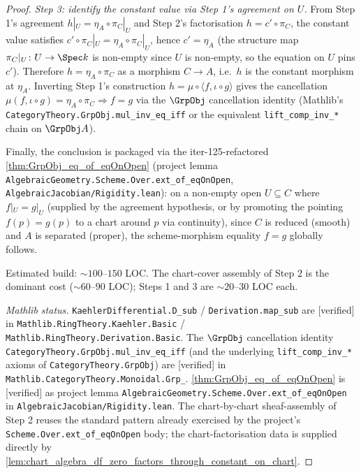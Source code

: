 \begin{proof}
  \emph{Step 3: identify the constant value via Step 1's agreement on \(U\).} From Step 1's agreement \(h|_{U} = \eta_A \circ \pi_C|_{U}\) and Step 2's factorisation \(h = c' \circ \pi_C\), the constant value satisfies \(c' \circ \pi_C|_{U} = \eta_A \circ \pi_C|_{U}\), hence \(c' = \eta_A\) (the structure map \(\pi_C|_{U} \colon U \to \Spec k\) is non-empty since \(U\) is non-empty, so the equation on \(U\) pins \(c'\)). Therefore \(h = \eta_A \circ \pi_C\) as a morphism \(C \to A\), i.e.\ \(h\) is the constant morphism at \(\eta_A\). Inverting Step 1's construction \(h = \mu \circ \langle f, \iota \circ g \rangle\) gives the cancellation \(\mu(f, \iota \circ g) = \eta_A \circ \pi_C \Rightarrow f = g\) via the \(\GrpObj\) cancellation identity (Mathlib's \texttt{CategoryTheory.GrpObj.mul\_inv\_eq\_iff} or the equivalent \texttt{lift\_comp\_inv\_*} chain on \(\GrpObj A\)).

  Finally, the conclusion is packaged via the iter-125-refactored \cref{thm:GrpObj_eq_of_eqOnOpen} (project lemma \texttt{AlgebraicGeometry.Scheme.Over.ext\_of\_eqOnOpen}, \texttt{AlgebraicJacobian/Rigidity.lean}): on a non-empty open \(U \subseteq C\) where \(f|_{U} = g|_{U}\) (supplied by the agreement hypothesis, or by promoting the pointing \(f(p) = g(p)\) to a chart around \(p\) via continuity), since \(C\) is reduced (smooth) and \(A\) is separated (proper), the scheme-morphism equality \(f = g\) globally follows.

  Estimated build: \(\sim 100\)--\(150\) LOC. The chart-cover assembly of Step 2 is the dominant cost (\(\sim 60\)--\(90\) LOC); Steps 1 and 3 are \(\sim 20\)--\(30\) LOC each.

  \emph{Mathlib status.} \texttt{KaehlerDifferential.D\_sub} / \texttt{Derivation.map\_sub} are [verified] in \texttt{Mathlib.RingTheory.Kaehler.Basic} / \texttt{Mathlib.RingTheory.Derivation.Basic}. The \(\GrpObj\) cancellation identity \texttt{CategoryTheory.GrpObj.mul\_inv\_eq\_iff} (and the underlying \texttt{lift\_comp\_inv\_*} axioms of \texttt{CategoryTheory.GrpObj}) are [verified] in \texttt{Mathlib.CategoryTheory.Monoidal.Grp\_}. \cref{thm:GrpObj_eq_of_eqOnOpen} is [verified] as project lemma \texttt{AlgebraicGeometry.Scheme.Over.ext\_of\_eqOnOpen} in \texttt{AlgebraicJacobian/Rigidity.lean}. The chart-by-chart sheaf-assembly of Step 2 reuses the standard pattern already exercised by the project's \texttt{Scheme.Over.ext\_of\_eqOnOpen} body; the chart-factorisation data is supplied directly by \cref{lem:chart_algebra_df_zero_factors_through_constant_on_chart}.


\end{proof}

